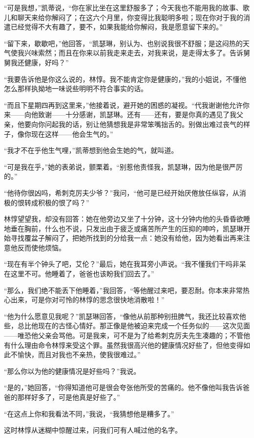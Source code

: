 \par “可是我想，”凯蒂说，“你在家比坐在这里舒服多了；今天我也不能用我的故事、歌儿和聊天来给你解闷了；在这六个月里，你变得比我聪明多啦；现在你对于我的消遣已经觉得不大有趣了，要不，如果我能给你解闷，我是愿意留下来的。”
\par “留下来，歇歇吧，”他回答，“凯瑟琳，别认为、也别说我很不舒服；是这闷热的天气使我兴味索然；而且在你来以前我走来走去，对我来说，是走得太多了。告诉舅舅我还健康，好吗？”
\par “我要告诉他是你这么说的，林惇。我不能肯定你是健康的，”我的小姐说，不懂他怎么那样执拗地一味说些明明不符合事实的话。
\par “而且下星期四再到这里来，”他接着说，避开她的困惑的凝视。“代我谢谢他允许你来——向他致谢——十分感谢，凯瑟琳。还有——还有，要是你真的遇见了我父亲，他要向你问起我的话，别让他猜想我是非常笨嘴拙舌的。别做出难过丧气的样子，像你现在这样——他会生气的。”
\par “我才不在乎他生气哩，”凯蒂想到他会生她的气，就叫道。
\par “可是我在乎，”她的表弟说，颤栗着。“别惹他责怪我，凯瑟琳，因为他是很严厉的。”
\par “他待你很凶吗，希刺克厉夫少爷？”我问，“他可是已经开始厌倦放任纵容，从消极的恨转成积极的恨了吗？”
\par 林惇望望我，却没有回答：她在他旁边又坐了十分钟，这十分钟内他的头昏昏欲睡地垂在胸前，什么也不说，只发出由于疲乏或痛苦所产生的压抑的呻吟，凯瑟琳开始寻找覆盆子解闷了，把她所找到的分给我一点：她没有给他，因为她看出再来注意他反而使他烦恼。
\par “现在有半个钟头了吧，艾伦？”最后，她在我耳旁小声说。“我不懂我们干吗非呆在这里不可。他睡着了，爸爸也该盼我们回去了。”
\par “那么，我们绝不能丢下他睡着，”我回答，“等他醒过来吧，要忍耐。你本来非常热心出来，可是你对可怜的林惇的思念很快地消散啦！”
\par “他为什么愿意见我呢？”凯瑟琳回答，“像他从前那种别扭脾气，我还比较喜欢他些，总比他现在的古怪心情好。那正像是他被迫来完成一个任务似的——这次见面——唯恐他父亲会骂他。可是我来，可不是为了给希刺克厉夫先生凑趣的；不管他有什么理由命令林惇来受这个罪。虽然我很高兴他的健康情况好些了，但他变得如此不愉快，而且对我也不亲热，使我很难过。”
\par “那么你以为他的健康情况是好些吗？”我说。
\par “是的，”她回答，“你得知道他可是很会夸张他所受的苦痛的。他不像他叫我告诉爸爸的那样好多了，可是他真是好些了。”
\par “在这点上你和我看法不同，”我说，“我猜想他是糟多了。”
\par 这时林惇从迷糊中惊醒过来，问我们可有人喊过他的名字。
